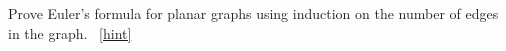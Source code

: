 \documentclass{book}
\begin{document}
\setcounter{project}{25}
\addtocounter{project}{-1}
\begin{activity}[]\label{activity-20}
\hypertarget{p-273}{}%
Prove Euler's formula for planar graphs using induction on the number of edges in the graph.%
~\hfill{\tiny\hyperlink{a-25}{[hint]}\hypertarget{q-25}{}}\end{activity}
\end{document}
